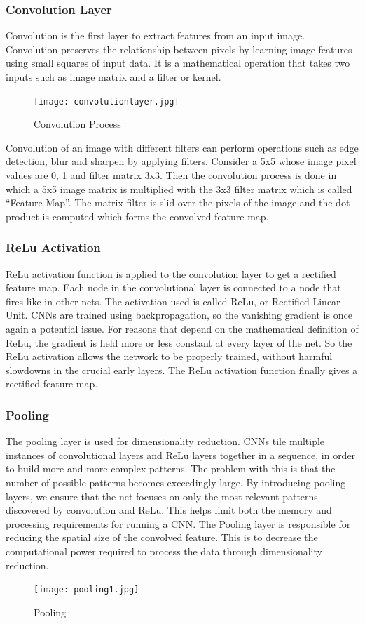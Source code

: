 \subsubsection{Convolution Layer}
Convolution is the first layer to extract features from an input image. Convolution preserves the relationship between pixels by learning image features using small squares of input data. It is a mathematical operation that takes two inputs such as image matrix and a filter or kernel.
\begin{figure}[h]
	\label{ss}
	\centering
	\texttt{[image: convolutionlayer.jpg]}
	\caption{Convolution Process}
\end{figure}

Convolution of an image with different filters can perform operations such as edge detection, blur and sharpen by applying filters.
Consider a 5x5 whose image pixel values are 0, 1 and filter matrix 3x3. Then the convolution process is done in which a 5x5 image matrix is multiplied with the 3x3 filter matrix which is called “Feature Map”.
The matrix filter is slid over the pixels of the image and the dot product is computed which forms the convolved feature map.

\subsubsection{ReLu Activation}
ReLu activation function is applied to the convolution layer to get a rectified feature map.
Each node in the convolutional layer is connected to a node that fires like in other nets. The activation used is called ReLu, or Rectified Linear Unit. CNNs are trained using backpropagation, so the vanishing gradient is once again a potential issue. For reasons that depend on the mathematical definition of ReLu, the gradient is held more or less constant at every layer of the net. So the ReLu activation allows the network to be properly trained, without harmful slowdowns in the crucial early layers. The ReLu activation function finally gives a rectified feature map.

\subsubsection{Pooling}
The pooling layer is used for dimensionality reduction. CNNs tile multiple instances of
convolutional layers and ReLu layers together in a sequence, in order to build more and
more complex patterns. The problem with this is that the number of possible patterns becomes exceedingly large. By introducing pooling layers, we ensure that the net focuses on only the most relevant patterns discovered by convolution and ReLu. This helps limit
both the memory and processing requirements for running a CNN. The Pooling layer is responsible for reducing the spatial size of the convolved feature. This is to decrease the computational power required to process the data through dimensionality reduction. \\
\begin{figure}[h]
	\label{ss}
	\centering
	\texttt{[image: pooling1.jpg]}
	\caption{Pooling}
\end{figure}

